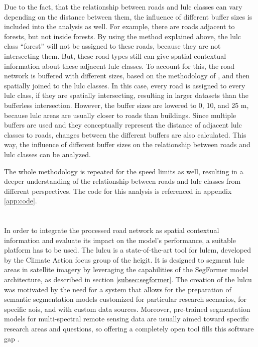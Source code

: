 Due to the fact, that the relationship between roads and \gls{lulc} classes can vary depending on the distance between them, the influence of different buffer sizes is included into the analysis as well. For example, there are roads adjacent to forests, but not inside forests. By using the method explained above, the \gls{lulc} class \enquote{forest} will not be assigned to these roads, because they are not intersecting them. But, these road types still can give spatial contextual information about these adjacent \gls{lulc} classes. To account for this, the road network is buffered with different sizes, based on the methodology of \textcite{Atwal.Anderson.ea2022}, and then spatially joined to the \gls{lulc} classes. In this case, every road is assigned to every \gls{lulc} class, if they are spatially intersecting, resulting in larger datasets than the bufferless intersection. However, the buffer sizes are lowered to 0, 10, and 25 m, because \gls{lulc} areas are usually closer to roads than buildings. Since multiple buffers are used and they conceptually represent the distance of adjacent \gls{lulc} classes to roads, changes between the different buffers are also calculated. This way, the influence of different buffer sizes on the relationship between roads and \gls{lulc} classes can be analyzed.

The whole methodology is repeated for the speed limits as well, resulting in a deeper understanding of the relationship between roads and \gls{lulc} classes from different perspectives. The code for this analysis is referenced in appendix \ref{app:code}.

\section{}

In order to integrate the processed road network as spatial contextual information and evaluate its impact on the model's performance, a suitable platform has to be used. The \gls{lulcu} \autocite{HeiGIT2024a} is a state-of-the-art tool for \gls{lulcm}, developed by the Climate Action focus group of the \gls{heigit}. It is designed to segment \gls{lulc} areas in satellite imagery by leveraging the capabilities of the SegFormer model architecture, as described in section \ref{subsec:segformer}. The creation of the \gls{lulcu} was motivated by the need for a system that allows for the preparation of semantic segmentation models customized for particular research scenarios, for specific \glspl{aoi}, and with custom data sources. Moreover, pre-trained segmentation models for multi-spectral remote sensing data are usually aimed toward specific research areas and questions, so offering a completely open tool fills this software gap \autocite{Guo.Liu.ea2018}.

